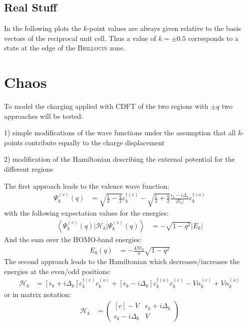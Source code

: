 \section{Real Stuff}

In the following plots the $k$-point values are always given relative to the basis vectors of the reciprocal unit cell. Thus a value of $k = \pm 0.5$ corresponds to a state at the edge of the \textsc{Brillouin} zone.
\chapter{Chaos}
To model the charging applied with CDFT of the two regions with $\pm q$ two approaches will be tested:
\begin{compactitem}
	\item[1)] simple modifications of the wave functions under the assumption that all $k$-points contribute equally to the charge displacement
	\item[2)] modification of the Hamiltonian describing the external potential for the different regions
\end{compactitem}
The first approach leads to the valence wave function:
\begin{align}
\Psi_k^{(v)}(q) &= \sqrt{\frac{1}{2}-\frac{q}{2}}c_k^{\dagger(e)}- \sqrt{\frac{1}{2}+\frac{q}{2}}\frac{\epsilon_k - i \Delta_k}{|E_k|}c_{k}^{\dagger(o)}
\end{align}
with the following expectation values for the energies:
\begin{align}
\left\langle\Psi_k^{(v)}(q)\Big|\mathcal{H}_{k}\Big|\Psi_k^{(v)}(q)\right\rangle &= -\sqrt{1-q^2} |E_k|
\end{align}
And the sum over the HOMO-band energies:
\begin{align}
E_0(q) &= -\frac{4Nt_0}{\pi} \sqrt{1-q^2}
\label{equation_equal_charge}
\end{align}
The second approach leads to the Hamiltonian which decreases/increases the energies at the even/odd positions:
\begin{align}
	\mathcal{H}_k &= \left[\epsilon_k + i\Delta_k\right]c_{k}^{\dagger(e)}c_{k}^{(o)} + \left[\epsilon_k-i\Delta_k \right]	c_{k}^{\dagger(o)}c_{k}^{(e)} - V n^{(e)}_k + V n^{(o)}_k
\end{align}
or in matrix notation:
\begin{align}
	\mathcal{H}_k &= \begin{pmatrix*}[c]
	-V & \epsilon_k + i \Delta_k \\
	\epsilon_k - i \Delta_k & V
	\end{pmatrix*}
\end{align}
